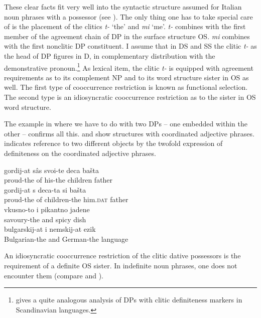 \documentclass[output=paper,colorlinks,citecolor=brown]{langscibook}
\begin{document}
\noindent These clear facts fit very well into the syntactic structure assumed for Italian noun phrases with a possessor (see ). The only thing one has to take special care of is the placement of the clitics \textit{t-} `the' and \textit{mi} `me'. \textit{t-} combines with the first member of the agreement chain of DP in the surface structure OS. \textit{mi} combines with the first nonclitic DP constituent. I assume that in DS and SS the clitic \textit{t-} as the head of DP figures in D, in complementary distribution with the demonstrative pronoun.\footnote{\citet{Delsing88The-Scandinavian, Delsing90A-DP-analysis} gives a quite analogous analysis of DPs with clitic definiteness markers in Scandinavian languages.} As lexical item, the clitic \textit{t-} is equipped with agreement requirements as to its complement NP and to its word structure sister in OS as well. The first type of cooccurrence restriction is known as functional selection. The second type is an idiosyncratic cooccurrence restriction as to the sister in OS word structure.

The example in  where we have to do with two DPs -- one embedded within the other -- confirms all this.  and  show structures with coordinated adjective phrases.  indicates reference to two different objects by the twofold expression of definiteness on the coordinated adjective phrases.

\ea \label{ex:zi91:40}
    \ea \label{ex:zi91:40a}
        \gll gordij-at sâs svoi-te deca bašta \\
        proud-the of his-the children father \\
        \glt
    \ex \label{ex:zi91:40b}
        \gll gordij-at s deca-ta si bašta \\
        proud-the of children-the him.\textsc{dat} father \\
    \z
\ex \label{ex:zi91:41}
    \gll vkusno-to i pikantno jadene \\
    savoury-the and spicy dish \\
    \glt
\ex \label{ex:zi91:42}
    \gll bulgarskij-at i nemskij-at ezik \\
    Bulgarian-the and German-the language \\
    \glt
\z

\noindent An idiosyncratic cooccurrence restriction of the clitic dative possessors is the requirement of a definite OS sister. In indefinite noun phrases, one does not encounter them (compare  and ).
\end{document}
